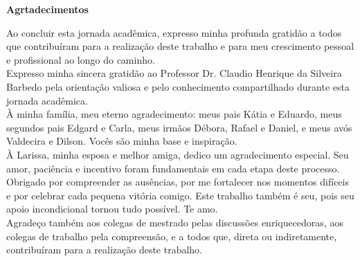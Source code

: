     \begin{center}
        \textbf{\Large Agrtadecimentos}\\[0.2cm]
    \end{center}
    \begin{flushleft}
        \setlength{\parskip}{1cm} %
        \linespread{1.5}\selectfont %
        \hspace*{0cm}\parbox{16.5cm}{
            Ao concluir esta jornada acadêmica, expresso minha profunda gratidão a todos que contribuíram para a realização deste trabalho e para meu crescimento pessoal e profissional ao longo do caminho.
\\Expresso minha sincera gratidão ao Professor Dr. Claudio Henrique da Silveira Barbedo pela orientação valiosa e pelo conhecimento compartilhado durante esta jornada acadêmica.
\\À minha família, meu eterno agradecimento: meus pais Kátia e Eduardo, meus segundos pais Edgard e Carla, meus irmãos Débora, Rafael e Daniel, e meus avós Valdecira e Dilson. Vocês são minha base e inspiração.
\\À Larissa, minha esposa e melhor amiga, dedico um agradecimento especial. Seu amor, paciência e incentivo foram fundamentais em cada etapa deste processo. Obrigado por compreender as ausências, por me fortalecer nos momentos difíceis e por celebrar cada pequena vitória comigo. Este trabalho também é seu, pois seu apoio incondicional tornou tudo possível. Te amo.
\\Agradeço também aos colegas de mestrado pelas discussões enriquecedoras, aos colegas de trabalho pela compreensão, e a todos que, direta ou indiretamente, contribuíram para a realização deste trabalho.
        }
    \end{flushleft}
    \newpage
    
    
    
    
    
    
    
    
    
    
    
    
    \thispagestyle{empty}


